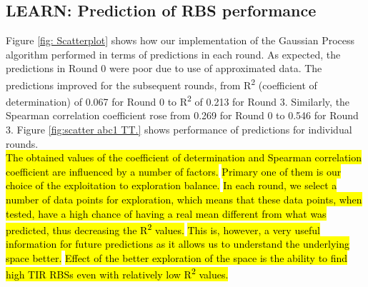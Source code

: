 \documentclass{article}
\begin{document}
\subsection{LEARN: Prediction of RBS performance}
\label{sec:gp-results}

Figure \ref{fig: Scatterplot} shows how our implementation of the Gaussian Process algorithm performed in terms of predictions in each round.
As expected, the predictions in Round 0 were poor due to use of approximated data.
The predictions improved for the subsequent rounds, from R\textsuperscript{2} (coefficient of determination) of 0.067 for Round 0 to R\textsuperscript{2} of 0.213 for Round 3.
Similarly, the Spearman correlation coefficient rose from 0.269 for Round 0 to 0.546 for Round 3.
Figure \ref{fig:scatter abc1 TT.} shows performance of predictions for individual rounds.\\

\hl{The obtained values of the coefficient of determination and Spearman correlation coefficient are influenced by a number of factors.}
\hl{Primary one of them is our choice of the exploitation to exploration balance.}
\hl{In each round, we select a number of data points for exploration, which means that these data points, when tested, have a high chance of having a real mean different from what was predicted, thus decreasing the R\textsuperscript{2} values.}
\hl{This is, however, a very useful information for future predictions as it allows us to understand the underlying space better.}
\hl{Effect of the better exploration of the space is the ability to find high TIR RBSs even with relatively low R\textsuperscript{2} values.}\\
\end{document}
